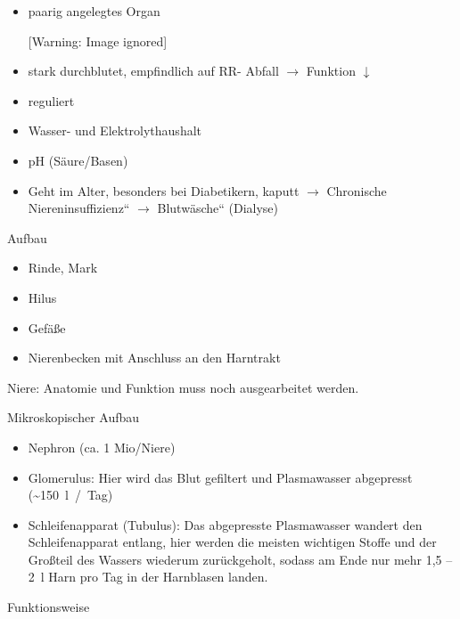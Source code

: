 \documentclass{article}
\begin{document}
\begin{itemize}
\item paarig angelegtes Organ

\begin{center}
 [Warning: Image ignored] %

\end{center}
\item stark durchblutet, empfindlich auf RR- Abfall ${\rightarrow}$
Funktion ${\downarrow}$ 

\item reguliert

\end{itemize}
\begin{itemize}
\item Wasser- und Elektrolythaushalt

\item pH (S\"aure/Basen)

\end{itemize}
\begin{itemize}
\item Geht im Alter, besonders bei Diabetikern, kaputt ${\rightarrow}$
{\quotedblbase}Chronische Niereninsuffizienz{\textquotedblleft}
${\rightarrow}$ {\quotedblbase}Blutw\"asche{\textquotedblleft}
(Dialyse)

\end{itemize}
Aufbau

\begin{itemize}
\item Rinde, Mark

\item Hilus

\item Gef\"a{\ss}e

\item Nierenbecken mit Anschluss an den Harntrakt

\end{itemize}
Niere: Anatomie und Funktion muss noch ausgearbeitet werden.

%
%
Mikroskopischer Aufbau

\begin{itemize}
\item Nephron (ca. 1 Mio/Niere)

\item Glomerulus: Hier wird das Blut gefiltert und Plasmawasser
abgepresst (\~{}150~l~/~Tag)

\item Schleifenapparat (Tubulus): Das abgepresste Plasma\-wasser wandert
den Schleifen\-apparat entlang, hier werden die meisten wichtigen
Stoffe und der Gro{\ss}\-teil des Wassers wiederum zur\"uckgeholt,
sodass am Ende nur mehr 1,5 -- 2~l Harn pro Tag in der Harnblasen
landen. 

\end{itemize}
Funktionsweise
\end{document}

